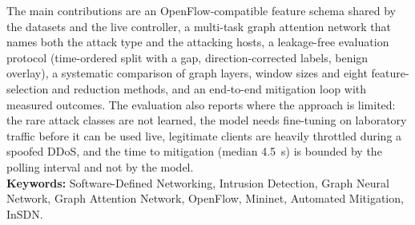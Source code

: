 The main contributions are an OpenFlow-compatible feature schema shared by the datasets and the live controller, a multi-task graph attention network that names both the attack type and the attacking hosts, a leakage-free evaluation protocol (time-ordered split with a gap, direction-corrected labels, benign overlay), a systematic comparison of graph layers, window sizes and eight feature-selection and reduction methods, and an end-to-end mitigation loop with measured outcomes. The evaluation also reports where the approach is limited: the rare attack classes are not learned, the model needs fine-tuning on laboratory traffic before it can be used live, legitimate clients are heavily throttled during a spoofed DDoS, and the time to mitigation (median 4.5~s) is bounded by the polling interval and not by the model.\\

\textbf{Keywords:} Software-Defined Networking, Intrusion Detection, Graph Neural Network, Graph Attention Network, OpenFlow, Mininet, Automated Mitigation, InSDN.
